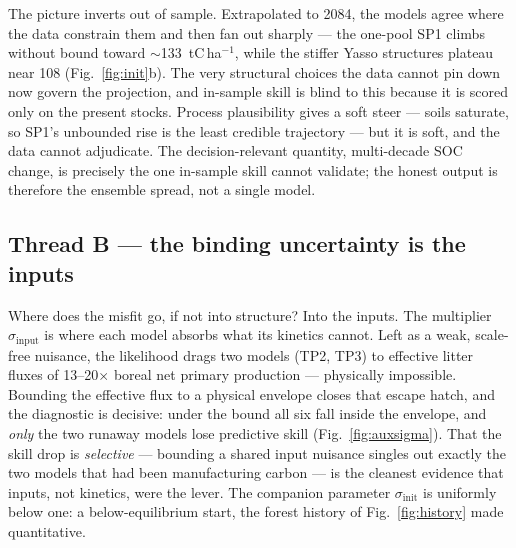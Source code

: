 \documentclass[11pt]{article}
\newcommand{\sinit}{\sigma_{\mathrm{init}}}
\newcommand{\sinput}{\sigma_{\mathrm{input}}}
\newcommand{\fig}{figures}
\begin{document}
\begin{table}[htbp]\centering
\caption{\textbf{Results at a glance.} Per-model structural complexity (pools, free parameters), skill ($R^2$
calibration and holdout, holdout RMSE), the input story (effective litter flux $\sinput\bar J$, all inside the
physical $[0.5,8.7]$~tC\,ha$^{-1}$\,yr$^{-1}$ envelope), and the initial state ($\sinit<1$). Complexity climbs while
skill does not.}\label{tab:summary}

\end{table}

The picture inverts out of sample. Extrapolated to 2084, the models agree where the data constrain them and then
fan out sharply --- the one-pool SP1 climbs without bound toward $\sim$133~tC\,ha$^{-1}$, while the stiffer Yasso
structures plateau near 108 (Fig.~\ref{fig:init}b). The very structural choices the data cannot pin down now govern
the projection, and in-sample skill is blind to this because it is scored only on the present stocks. Process
plausibility gives a soft steer --- soils saturate, so SP1's unbounded rise is the least credible trajectory --- but
it is soft, and the data cannot adjudicate. The decision-relevant quantity, multi-decade SOC change, is precisely
the one in-sample skill cannot validate; the honest output is therefore the ensemble spread, not a single model.

\subsection{Thread B --- the binding uncertainty is the inputs}
Where does the misfit go, if not into structure? Into the inputs. The multiplier $\sinput$ is where each model
absorbs what its kinetics cannot. Left as a weak, scale-free nuisance, the likelihood drags two models (TP2, TP3)
to effective litter fluxes of 13--20$\times$ boreal net primary production --- physically impossible. Bounding the
effective flux to a physical envelope closes that escape hatch, and the diagnostic is decisive: under the bound all
six fall inside the envelope, and \emph{only} the two runaway models lose predictive skill
(Fig.~\ref{fig:auxsigma}). That the skill drop is \emph{selective} --- bounding a shared input nuisance singles out
exactly the two models that had been manufacturing carbon --- is the cleanest evidence that inputs, not kinetics,
were the lever. The companion parameter $\sinit$ is uniformly below one: a below-equilibrium start, the forest
history of Fig.~\ref{fig:history} made quantitative.
\end{document}
